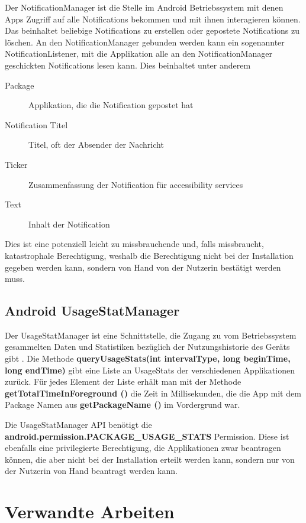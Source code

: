Der NotificationManager ist die Stelle im Android Betriebssystem mit denen Apps Zugriff auf alle Notifications bekommen und mit ihnen interagieren können.
Das beinhaltet beliebige Notifications zu erstellen oder gepostete Notifications zu löschen.
An den NotificationManager gebunden werden kann ein sogenannter NotificationListener, mit die Applikation alle an den NotificationManager geschickten Notifications lesen kann.
Dies beinhaltet unter anderem
\begin{description}
    \item [Package] Applikation, die die Notification gepostet hat
    \item [Notification Titel] Titel, oft der Absender der Nachricht
    \item [Ticker] Zusammenfassung der Notification für accessibility services
    \item [Text] Inhalt der Notification
\end{description}
Dies ist eine potenziell leicht zu missbrauchende und, falls missbraucht, katastrophale Berechtigung, weshalb die Berechtigung nicht bei der Installation gegeben werden kann, sondern von Hand von der Nutzerin bestätigt werden muss. 


\subsection {Android UsageStatManager}

Der UsageStatManager ist eine Schnittstelle, die Zugang zu vom Betriebssystem gesammelten Daten
und Statistiken bezüglich der Nutzungshistorie des Geräts gibt \cite{androidusagestat}.
Die Methode \textbf{queryUsageStats(int intervalType, long beginTime, long endTime)} gibt eine Liste an UsageStats der verschiedenen Applikationen zurück.
Für jedes Element der Liste erhält man mit der Methode \textbf{getTotalTimeInForeground ()} die Zeit in Millisekunden,
die die App mit dem Package Namen aus \textbf{getPackageName ()} im Vordergrund war.
\par
Die UsageStatManager API benötigt die \textbf{android.permission.PACKAGE\_USAGE\_STATS} Permission.
Diese ist ebenfalls eine privilegierte Berechtigung, die Applikationen zwar beantragen können, die aber nicht bei der Installation erteilt werden kann, sondern nur von der Nutzerin von Hand beantragt werden kann.


\section{Verwandte Arbeiten}
\label{ch:Grundlagen:sec:RelatedWork}

